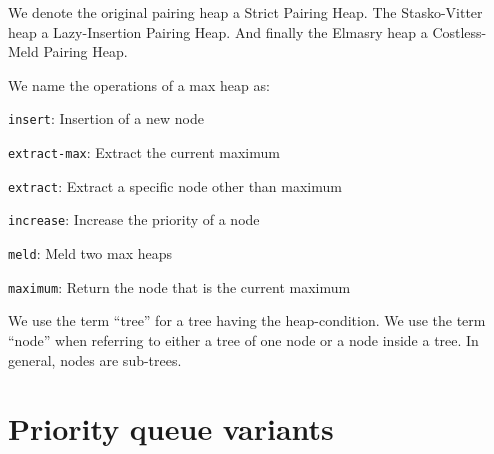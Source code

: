 \documentclass{DIKU-article}[2010/01/13]
\newcommand{\code}[1]{{\small\texttt{#1}}}
\begin{document}
We denote the original pairing heap\cite{fredman} a Strict Pairing
Heap. The Stasko-Vitter heap\cite{stasko} a Lazy-Insertion Pairing
Heap. And finally the Elmasry\cite{elmasry} heap a Costless-Meld
Pairing Heap.

We name the operations of a max heap as:
\begin{description}
\item{\code{insert}}: Insertion of a new node
\item{\code{extract-max}}: Extract the current maximum
\item{\code{extract}}: Extract a specific node other than maximum
\item{\code{increase}}: Increase the priority of a node
\item{\code{meld}}: Meld two max heaps
\item{\code{maximum}}: Return the node that is the current maximum
\end{description}

We use the term "`tree"' for a tree having the heap-condition. We
use the term "`node"' when referring to either a tree of one node or
a node inside a tree. In general, nodes are sub-trees.

\section{Priority queue variants}
\end{document}

